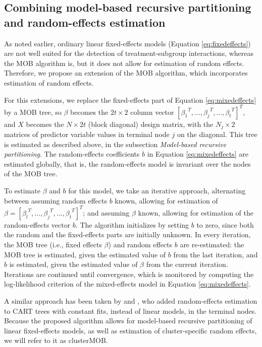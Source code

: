 \documentclass[nobf,man]{apa}
\begin{document}
\subsection{Combining model-based recursive partitioning and random-effects estimation}

As noted earlier, ordinary linear fixed-effects models (Equation \ref{eq:fixedeffects}) are not well suited for the detection of treatment-subgroup interactions, whereas the MOB algorithm is, but it does not allow for estimation of random effects. Therefore, we propose an extension of the MOB algorithm, which incorporates estimation of random effects. 

For this extensions, we replace the fixed-effects part of Equation \ref{eq:mixedeffects} by a MOB tree, so $\beta$ becomes the $2t \times 2$ column vector ${\left[{\beta_1}^T,...,{\beta_j}^T,...,{\beta_t}^T \right]}^T$, and $X$ becomes the $N \times 2t$ (block diagonal) design matrix, with the $N_{j} \times 2$ matrices of predictor variable values in terminal node $j$ on the diagonal. This tree is estimated as described above, in the subsection \textit{Model-based recursive partitioning}. The random-effects coefficients $b$ in Equation \ref{eq:mixedeffects} are estimated globally, that is, the random-effects model is invariant over the nodes of the MOB tree.

To estimate $\beta$ and $b$ for this model, we take an iterative approach, alternating between assuming random effects $b$ known, allowing for estimation of $\beta = {\left[ {\beta_l}^T,...,{\beta_j}^T,...,{\beta_t}^T \right]}^T$; and assuming $\beta$ known, allowing for estimation of the random-effects vector $b$. The algorithm initializes by setting $b$ to zero, since both the random and the fixed-effects parts are initially unknown. In every iteration, the MOB tree (i.e., fixed effects $\beta$) and random effects $b$ are re-estimated: the MOB tree is estimated, given the estimated value of $b$ from the last iteration, and $b$ is estimated, given the estimated value of $\beta$ from the current iteration. Iterations are continued until convergence, which is monitored by computing the log-likelihood criterion of the mixed-effects model in Equation \ref{eq:mixedeffects}.     

A similar approach has been taken by  and , who added random-effects estimation to CART trees with constant fits, instead of linear models, in the terminal nodes. Because the proposed algorithm allows for model-based recursive partitioning of linear fixed-effects models, as well as estimation of cluster-specific random effects, we will refer to it as clusterMOB. 
\end{document}
